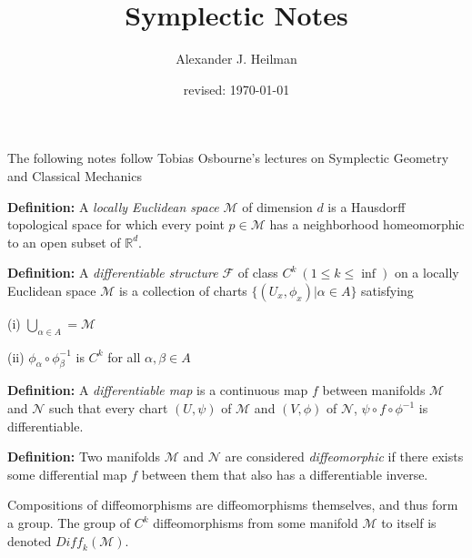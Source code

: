 \documentclass{article}\usepackage[]{graphicx}\usepackage[]{color}
\title{Symplectic Notes}%
\author{Alexander J. Heilman}%
\date{revised: \today}%
\begin{document}
\maketitle


\tableofcontents


\maketitle

\tableofcontents

The following notes follow Tobias Osbourne's lectures on Symplectic Geometry and Classical Mechanics %

\textbf{Definition:} A \textit{locally Euclidean space} $\mathcal{M}$ of dimension $d$ is a Hausdorff topological space for which every point $p\in \mathcal{M}$ has a neighborhood homeomorphic to an open subset of $\mathbb{R}^d$.





\textbf{Definition:} A \textit{differentiable structure} $\mathcal{F}$ of class $C^k\ (1\leq k \leq \inf)$ on a locally Euclidean space $\mathcal{M}$ is a collection of charts $\lbrace (U_x , \phi_x)\vert \alpha \in A \rbrace$ satisfying 

(i) $\bigcup_{\alpha \in A}=\mathcal{M}$

(ii) $\phi_{\alpha}\circ\phi_{\beta}^{-1}$ is $C^k$ for all $\alpha ,\beta \in A$




\textbf{Definition:} A \textit{differentiable map} is a continuous map $f$ between manifolds $\mathcal{M}$ and $\mathcal{N}$ such that every chart $(U,\psi )$ of $\mathcal{M}$ and $(V,\phi )$ of $\mathcal{N}$, $\psi\circ f\circ\phi^{-1}$ is differentiable.




\textbf{Definition:} Two manifolds $\mathcal{M}$ and $\mathcal{N}$ are considered \textit{diffeomorphic} if there exists some differential map $f$ between them that also has a differentiable inverse.

Compositions of diffeomorphisms are diffeomorphisms themselves, and thus form a group. The group of $C^k$ diffeomorphisms from some manifold $\mathcal{M}$ to itself is denoted $\mathit{Diff_k}(\mathcal{M})$.
\end{document}
